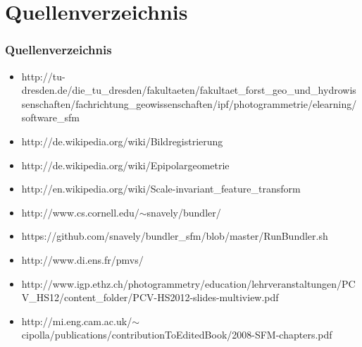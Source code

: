 \documentclass{beamer}
\begin{document}

\section{Quellenverzeichnis}
\begin{frame}
	\frametitle{Quellenverzeichnis}
	
	\begin{tiny}
	\begin{itemize}
		\item http://tu-dresden.de/die\_tu\_dresden/fakultaeten/fakultaet\_forst\_geo\_und\_hydrowissenschaften/fachrichtung\_geowissenschaften/ipf/photogrammetrie/elearning/software\_sfm
		\item http://de.wikipedia.org/wiki/Bildregistrierung
		\item http://de.wikipedia.org/wiki/Epipolargeometrie
		\item http://en.wikipedia.org/wiki/Scale-invariant\_feature\_transform
		\item http://www.cs.cornell.edu/$\sim$snavely/bundler/
		\item https://github.com/snavely/bundler\_sfm/blob/master/RunBundler.sh
		\item http://www.di.ens.fr/pmvs/
		\item http://www.igp.ethz.ch/photogrammetry/education/lehrveranstaltungen/PCV\_HS12/content\_folder/PCV-HS2012-slides-multiview.pdf
		\item http://mi.eng.cam.ac.uk/$\sim$cipolla/publications/contributionToEditedBook/2008-SFM-chapters.pdf
	\end{itemize}
	\end{tiny}
\end{frame}



\end{document}

